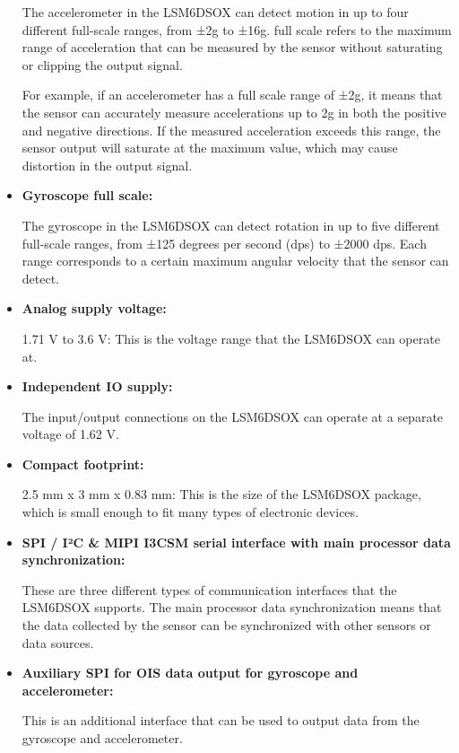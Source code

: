 \begin{itemize}
 The accelerometer in the LSM6DSOX can detect motion in up to four different full-scale ranges, from ±2g to ±16g. full scale refers to the maximum range of acceleration that can be measured by the sensor without saturating or clipping the output signal. 

\bigskip

 For example, if an accelerometer has a full scale range of ±2g,\cite{Liu:2022} it means that the sensor can accurately measure accelerations up to 2g in both the positive and negative directions. If the measured acceleration exceeds this range, the sensor output will saturate at the maximum value, which may cause distortion in the output signal.

\item  \textbf{Gyroscope full scale: }
 
 The gyroscope in the LSM6DSOX can detect rotation in up to five different full-scale ranges, from ±125 degrees per second (dps) to ±2000 dps. Each range corresponds to a certain maximum angular velocity that the sensor can detect.

\item  \textbf{Analog supply voltage: }

 1.71 V to 3.6 V: This is the voltage range that the LSM6DSOX can operate at.

 \item  \textbf{Independent IO supply: }
 
 The input/output connections on the LSM6DSOX can operate at a separate voltage of 1.62 V.

 \item  \textbf{Compact footprint: }
 
 2.5 mm x 3 mm x 0.83 mm: This is the size of the LSM6DSOX package, which is small enough to fit many types of electronic devices.
 

\item  \textbf{SPI / I²C \& MIPI I3CSM serial interface with main processor data synchronization:}
 
 These are three different types of communication interfaces that the LSM6DSOX supports. The main processor data synchronization means that the data collected by the sensor can be synchronized with other sensors or data sources.


\item  \textbf{Auxiliary SPI for OIS data output for gyroscope and accelerometer: }
 
 This is an additional interface that can be used to output data from the gyroscope and accelerometer.


\end{itemize}

